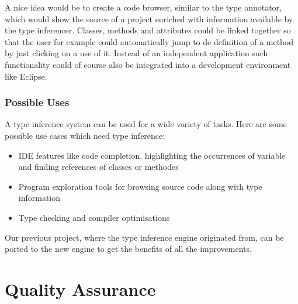 \documentclass[12pt,halfparskip,DIV11,BCOR10mm]{scrreprt}
\begin{document}
A nice idea would be to create a code browser, similar to the type annotator, which would show the source of a project enriched with information available by the type inferencer. Classes, methods and attributes could be linked together so that the user for example could automatically jump to de definition of a method by just clicking on a use of it. Instead of an independent application such functionality could of course also be integrated into a development environment like Eclipse.
\subsection{Possible Uses}

A type inference system can be used for a wide variety of tasks. Here are some possible use cases which need type inference:

\begin{itemize}
    \item IDE features like code completion, highlighting the occurrences of variable and finding references of classes or methodes
    \item Program exploration tools for browsing source code along with type information
    \item Type checking and compiler optimisations
\end{itemize}

Our previous project, where the type inference engine originated from, can be ported to the new engine to get the benefits of all the improvements.


\chapter{Quality Assurance}

\end{document}
